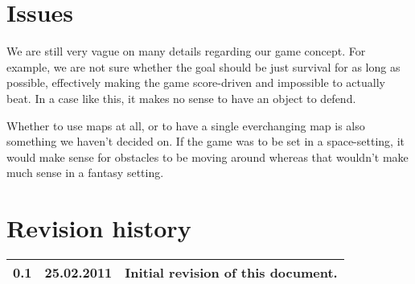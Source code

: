 \documentclass[titlepage,a4paper,11pt]{article}
\begin{document}
\section{Issues}
We are still very vague on many details regarding our game concept. For example,
we are not sure whether the goal should be just survival for as long as possible,
effectively making the game score-driven and impossible to actually beat. In a
case like this, it makes no sense to have an object to defend.

Whether to use maps at all, or to have a single everchanging map is also something
we haven't decided on. If the game was to be set in a space-setting, it would
make sense for obstacles to be moving around whereas that wouldn't make much sense
in a fantasy setting. 

\section{Revision history}

\begin{table}[H]
  \begin{tabular}{| c | c | c |}
    \hline
    0.1 & 25.02.2011 & Initial revision of this document. \\
    \hline
  \end{tabular}
\end{table}
\end{document}
